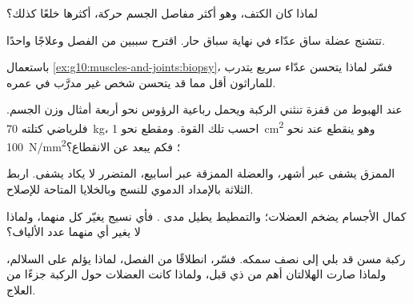 \begin{exercise}[$\star\star$]\label{exo:g10:muscles-and-joints:9}
لماذا كان الكتف، وهو أكثر مفاصل الجسم حركة، أكثرها خلعًا كذلك؟
\end{exercise}

\begin{exercise}[$\star\star$]\label{exo:g10:muscles-and-joints:10}
تتشنج عضلة ساق عدّاء في نهاية سباق حار. اقترح سببين من الفصل وعلاجًا
واحدًا.
\end{exercise}

\begin{exercise}[$\star\star$]\label{exo:g10:muscles-and-joints:11}
باستعمال \cref{ex:g10:muscles-and-joints:biopsy}، فسّر لماذا يتحسن
عدّاء سريع يتدرب للماراثون أقل مما قد يتحسن شخص غير مدرَّب في عمره.
\end{exercise}

\begin{exercise}[$\star\star\star$]\label{exo:g10:muscles-and-joints:12}
عند الهبوط من قفزة تنثني الركبة ويحمل  رباعية الرؤوس نحو أربعة
أمثال وزن الجسم. فلرياضي كتلته \qty{70}{kg}، احسب تلك القوة. ومقطع
 نحو \qty{1}{cm^2} وهو ينقطع عند نحو \qty{100}{N/mm^2}؛ فكم يبعد
عن الانقطاع؟
\end{exercise}

\begin{exercise}[$\star\star\star$]\label{exo:g10:muscles-and-joints:13}
 الممزق يشفى عبر أشهر، والعضلة الممزقة عبر أسابيع، 
المتضرر لا يكاد يشفى. اربط الثلاثة بالإمداد الدموي للنسج وبالخلايا
المتاحة للإصلاح.
\end{exercise}

\begin{exercise}[$\star\star\star$]\label{exo:g10:muscles-and-joints:14}
كمال الأجسام يضخم العضلات؛ والتمطيط يطيل مدى . فأي نسيج يغيّر
كل منهما، ولماذا لا يغير أي منهما عدد الألياف؟
\end{exercise}

\begin{exercise}[$\star\star\star$]\label{exo:g10:muscles-and-joints:15}
 ركبة مسن قد بلي إلى نصف سمكه. فسّر، انطلاقًا من الفصل، لماذا
يؤلم  على السلالم، ولماذا صارت الهلالتان أهم من ذي قبل، ولماذا
كانت العضلات حول الركبة جزءًا من العلاج.
\end{exercise}

